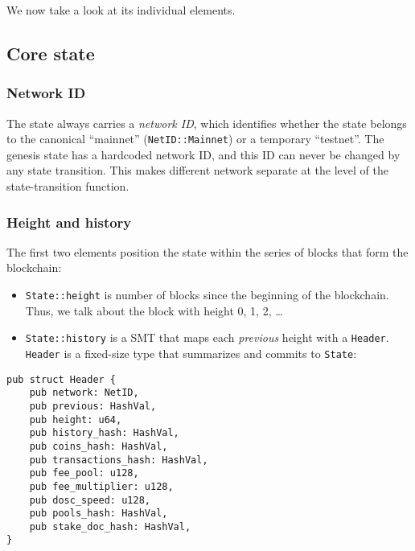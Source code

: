 \documentclass[
]{article}
\newcommand{\passthrough}[1]{#1}
\providecommand{\tightlist}{%
  \setlength{\itemsep}{0pt}\setlength{\parskip}{0pt}}
\begin{document}
We now take a look at its individual elements.

\hypertarget{core-state}{%
  \subsection{Core state}\label{core-state}}

\hypertarget{network-id}{%
  \subsubsection{Network ID}\label{network-id}}

The state always carries a \emph{network ID}, which identifies whether
the state belongs to the canonical ``mainnet''
(\passthrough{\lstinline!NetID::Mainnet!}) or a temporary ``testnet''.
The genesis state has a hardcoded network ID, and this ID can never be
changed by any state transition. This makes different network separate
at the level of the state-transition function.

\hypertarget{height-and-history}{%
  \subsubsection{Height and history}\label{height-and-history}}

The first two elements position the state within the series of blocks
that form the blockchain:

\begin{itemize}
  \tightlist
  \item
        \passthrough{\lstinline!State::height!} is number of blocks since the
        beginning of the blockchain. Thus, we talk about the block with height
        0, 1, 2, \ldots{}
  \item
        \passthrough{\lstinline!State::history!} is a SMT that maps each
        \emph{previous} height with a \passthrough{\lstinline!Header!}.
        \passthrough{\lstinline!Header!} is a fixed-size type that summarizes
        and commits to \passthrough{\lstinline!State!}:
\end{itemize}

\begin{lstlisting}
pub struct Header {
    pub network: NetID,
    pub previous: HashVal,
    pub height: u64,
    pub history_hash: HashVal,
    pub coins_hash: HashVal,
    pub transactions_hash: HashVal,
    pub fee_pool: u128,
    pub fee_multiplier: u128,
    pub dosc_speed: u128,
    pub pools_hash: HashVal,
    pub stake_doc_hash: HashVal,
}
\end{lstlisting}
\end{document}
